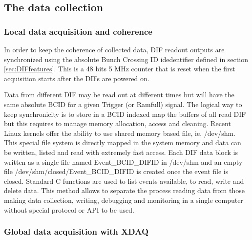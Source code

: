 \documentclass[english]{article}
\begin{document}
\subsection{The data collection}

\subsubsection{Local data acquisition and coherence}

 In order to  keep the coherence of collected data, DIF  readout outputs are synchronized using the absolute Bunch Crossing ID idedentifier defined in section \ref{sec:DIFfeatures}.
 This is a 48 bits  5 MHz counter that is reset when the first acquisition starts after the DIFs are powered on.  

Data from different DIF may be read out at  different times but will have the same absolute BCID for a given Trigger (or Ramfull) signal.
The logical way to keep synchronicity is to store in a BCID indexed
map the buffers of all read DIF but this requires to manage memory
allocation, access and cleaning. Recent Linux kernels offer the ability
to use shared memory based file, ie, /dev/shm. This special file system
is directly mapped in the system memory and data can be written, listed
and read with extremely fast access. Each DIF data block is written
as a single file named Event\_BCID\_DIFID in /dev/shm and an empty file
/dev/shm/closed/Event\_BCID\_DIFID is created once the event file
is closed. Standard C functions are used to list events available,
to read, write and delete data. This method allows to separate the
process reading data from those making data collection, writing,
debugging and monitoring in a single computer without special protocol
or API to be used.


\subsubsection{Global data acquisition with XDAQ}
\end{document}

